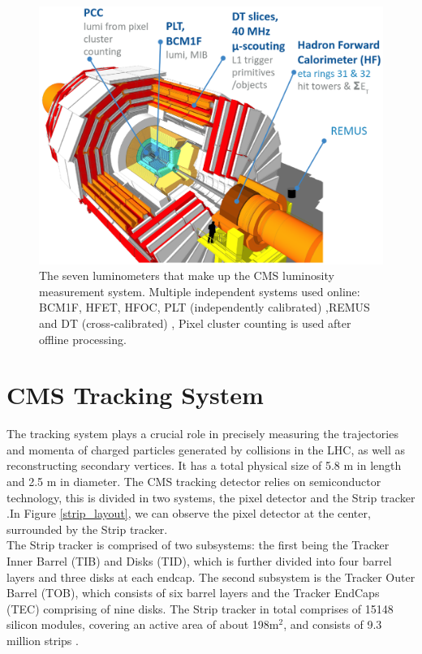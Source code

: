 \begin{center}
  \begin{figure}[ht]
    \centering
    \includegraphics[scale=.3]{Chapter2/detectors.png}
    \caption[CMS Luminometers]{The seven luminometers that make up the CMS luminosity measurement system. Multiple independent systems used online: BCM1F, HFET, HFOC, PLT (independently calibrated) ,REMUS and  DT (cross-calibrated) , Pixel cluster counting is used after offline processing.}
    \label{luminometers}
  \end{figure}
\end{center}

\section{CMS Tracking System}

The tracking system plays a crucial role in precisely measuring the trajectories and momenta of charged particles generated by collisions in the LHC, as well as reconstructing secondary vertices. It has a total physical size of 5.8 m in length and 2.5 m in diameter. 
The CMS tracking detector relies on semiconductor technology, this is divided in two systems, the pixel detector and the Strip tracker \cite{CMS_Exp_2008}.In Figure \ref{strip_layout}, we can observe the pixel detector at the center, surrounded by the Strip tracker.\\

The Strip tracker is comprised of two subsystems: the first being the Tracker Inner Barrel (TIB) and Disks (TID), which is further divided into four barrel layers and three disks at each endcap. The second subsystem is the Tracker Outer Barrel (TOB), which consists of six barrel layers and the Tracker EndCaps (TEC) comprising of nine disks. The Strip tracker in total comprises of 15148 silicon modules, covering an active area of about 198$\text{m}^{2}$, and consists of 9.3 million strips \cite{CMS_Exp_2008}. \\

